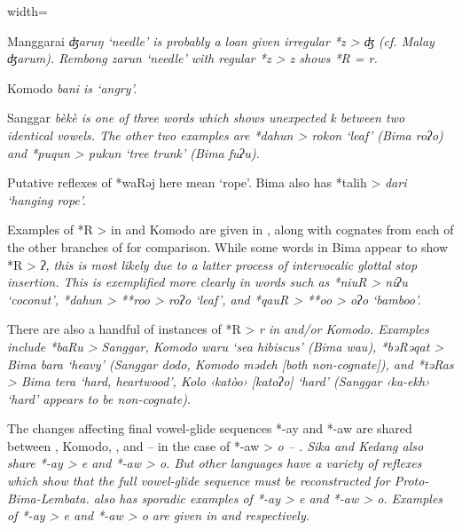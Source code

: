 \begin{table}[p]
\begin{adjustbox}{width=\textwidth}
\begin{threeparttable}
\begin{tablenotes}
			\item[vi]	{Manggarai \it{ʤaruŋ} ‘needle’ is probably a loan given irregular *z > \it{ʤ}
								(cf. Malay \it{ʤarum}).
								Rembong \it{zarun} ‘needle’ with regular *z > \it{z} shows  *R = \it{r.}}
			\item[vii]	{Komodo \it{bani} is ‘angry’.}
			\item[viii]	{Sanggar \it{\<bèkè\>} is one of three words which shows unexpected
								\it{k} between two identical vowels.
								The other two examples are *dahun > \it{rokon} ‘leaf’ (Bima \it{roʔo})
								and *puqun > \it{pukun} ‘tree trunk’ (Bima \it{fuʔu}).}
			\item[ix]	{Putative reflexes of *waRəj here mean ‘rope’.
								Bima also has *talih > \it{dari} ‘hanging rope’.}
		\end{tablenotes}
	\end{threeparttable}
\end{adjustbox}
\end{table}

Examples of *R > {\0} in 
and Komodo are given in , along with cognates from each of the other branches
of  for comparison.
While some words in Bima appear to show *R > \it{ʔ},
this is most likely due to a latter process of intervocalic glottal stop insertion.
This is exemplified more clearly in words such as *niuR > \it{niʔu}
‘coconut’, *dahun > **roo > \it{roʔo} ‘leaf’,
and *qauR > **oo > \it{oʔo} ‘bamboo’.

There are also a handful of instances of *R > \it{r} in  and/or Komodo.
Examples include *baRu > Sanggar,
Komodo \it{waru} ‘sea hibiscus’ (Bima \it{wau}),
*bəRəqat > Bima \it{bara} ‘heavy’ (Sanggar \it{dodo},
Komodo \it{mədeh} [both non-cognate]),
and *təRas > Bima \it{tera} ‘hard,
heartwood’, Kolo ‹katòo› [katoʔo] ‘hard’ (Sanggar ‹ka-ekh›
‘hard’ appears to be non-cognate).

The changes affecting final vowel-glide sequences *-ay
and *-aw are shared between ,
Komodo, , and -- in the case of *-aw > \it{o} -- .
Sika and Kedang also share *-ay > \it{e}
and *-aw > \it{o}.
But other  languages have
a variety of reflexes which show that the full vowel-glide sequence
must be reconstructed for Proto-Bima-Lembata.
 also has sporadic examples of *-ay > \it{e}
and *-aw > \it{o}.
Examples of *-ay > \it{e}
and *-aw > \it{o} are given in 
and  respectively.

